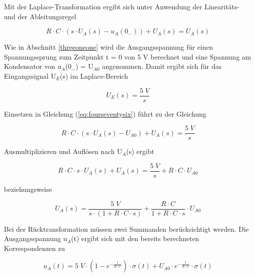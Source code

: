 \noindent Mit der Laplace-Transformation ergibt sich unter Anwendung der Linearitäts- und der Ableitungsregel 

\begin{equation}\label{eq:fourseventysix}
R\cdot C\cdot \left(s\cdot U_{A} \left(s\right)-u_{A} \left(0_{-} \right)\right)+U_{A} \left(s\right)=U_{A} \left(s\right)
\end{equation}

\noindent Wie in Abschnitt \ref{threeoneone} wird die Ausgangsspannung für einen Spannungssprung zum Zeitpunkt t = 0 von 5 V berechnet und eine Spannung am Kondensator von u${}_{A}$(0${}_{-}$) = U${}_{A0}$ angenommen. Damit ergibt sich für das Eingangssignal U${}_{E}$(s) im Laplace-Bereich

\begin{equation}\label{eq:fourseventyseven}
U_{E} \left(s\right)=\frac{5\;V}{s}
\end{equation}

\noindent Einsetzen in Gleichung (\eqref{eq:fourseventysix}) f\"{u}hrt zu der Gleichung

\begin{equation}\label{eq:fourseventyeight}
R\cdot C\cdot \left(s\cdot U_{A} \left(s\right)-U_{A0} \right)+U_{A} \left(s\right)=\frac{5\;V}{s}
\end{equation}

\noindent Ausmultiplizieren und Auflösen nach U$_{A}$(s) ergibt

\begin{equation}\label{eq:fourseventynine}
R\cdot C\cdot s\cdot U_{A} \left(s\right)+U_{A} \left(s\right)=\frac{5\;V}{s} +R\cdot C\cdot U_{A0} 
\end{equation}

\noindent beziehungsweise

\begin{equation}\label{eq:foureighty}
U_{A} \left(s\right)=\frac{5\;V}{s\cdot \left(1+R\cdot C\cdot s\right)} +\frac{R\cdot C}{1+R\cdot C\cdot s} \cdot U_{A0} 
\end{equation}

\noindent Bei der Rücktransformation müssen zwei Summanden berücksichtigt werden. Die Ausgangsspannung u$_{A}$(t) ergibt sich mit den bereits berechneten Korrespondenzen zu

\begin{equation}\label{eq:foureightyone}
u_{A} \left(t\right)=5\;V\cdot \left(1-e^{-\frac{t}{R\cdot C} } \right)\cdot \sigma \left(t\right)+U_{A0} \cdot e^{-\frac{t}{R\cdot C} } \cdot \sigma \left(t\right) 
\end{equation}


